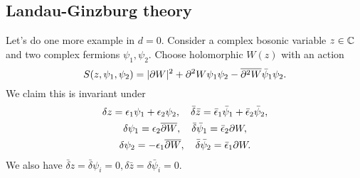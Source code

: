\subsection*{Landau-Ginzburg theory}
Let's do one more example in $d=0$. Consider a complex bosonic variable $z\in \mathbb{C}$ and two complex fermions $\psi_1,\psi_2$. Choose holomorphic $W(z)$ with an action
\begin{equation}
    S(z,\psi_1,\psi_2)= \lvert\partial W\rvert^2 + \partial^2 W \psi_1 \psi_2 -\overline{\partial^2 W} \bar \psi_1 \psi_2.
\end{equation}
We claim this is invariant under
\begin{gather*}
    \delta z = \epsilon_1 \psi_1 + \epsilon_2 \psi_2, \quad \bar \delta \bar z = \bar \epsilon_1 \bar \psi_1 + \bar \epsilon_2 \bar \psi_2,\\
    \delta \psi_1 = \epsilon_2 \overline{\partial W}, \quad \bar \delta \bar \psi_1 = \bar \epsilon_2 \partial W,\\
    \delta \psi_2 = -\epsilon_1 \overline{\partial W}, \quad \bar \delta \bar \psi_2 = \bar \epsilon_1 \partial W.
\end{gather*}
We also have $\bar \delta z = \bar \delta \psi_i =0, \delta \bar z = \delta \bar \psi_i =0.$

